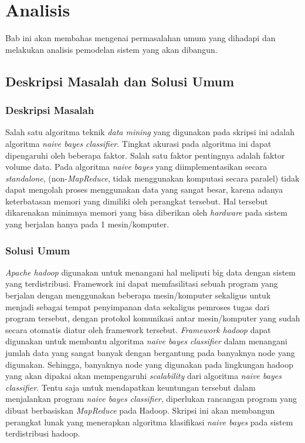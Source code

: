 \chapter{Analisis}

Bab ini akan membahas mengenai permasalahan umum yang dihadapi dan melakukan analisis pemodelan sistem yang akan dibangun.

\section{Deskripsi Masalah dan Solusi Umum}
\subsection{Deskripsi Masalah}
Salah satu algoritma teknik \textit{data mining} yang digunakan pada skripsi ini adalah algoritma \textit{naive bayes classifier}. Tingkat akurasi pada algoritma ini dapat dipengaruhi oleh beberapa faktor. Salah satu faktor pentingnya adalah faktor volume data. Pada algoritma \textit{naive bayes} yang diimplementasikan secara \textit{standalone}, (non-\textit{MapReduce}, tidak menggunakan komputasi secara paralel) tidak dapat mengolah proses menggunakan data yang sangat besar, karena adanya keterbatasan memori yang dimiliki oleh perangkat tersebut. Hal tersebut dikarenakan minimnya memori yang bisa diberikan oleh \textit{hardware} pada sistem yang berjalan hanya pada 1 mesin/komputer.
\subsection{Solusi Umum}
\textit{Apache hadoop} digunakan untuk menangani hal meliputi big data dengan sistem yang terdistribusi. Framework ini dapat memfasilitasi sebuah program yang berjalan dengan menggunakan beberapa mesin/komputer sekaligus untuk menjadi sebagai tempat penyimpanan data sekaligus pemroses tugas dari program tersebut, dengan protokol komunikasi antar mesin/komputer yang sudah secara otomatis diatur oleh framework tersebut. \textit{Framework hadoop} dapat digunakan untuk membantu algoritma \textit{naive bayes classifier} dalam menangani jumlah data yang sangat banyak dengan bergantung pada banyaknya node yang digunakan. Sehingga, banyaknya node yang digunakan pada lingkungan hadoop yang akan dipakai akan mempengaruhi \textit{scalability} dari algoritma \textit{naive bayes classifier}. Tentu saja untuk mendapatkan keuntungan tersebut dalam menjalankan program \textit{naive bayes classifier}, diperlukan rancangan program yang dibuat berbasiskan \textit{MapReduce} pada Hadoop. Skripsi ini akan membangun perangkat lunak yang menerapkan algoritma klasifikasi \textit{naive bayes} pada sistem terdistribusi hadoop.

